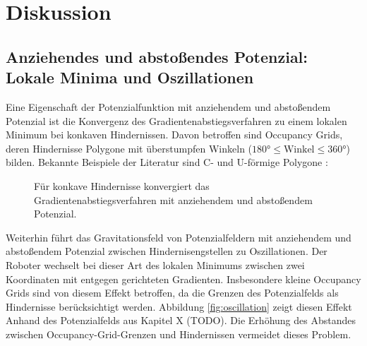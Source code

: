 \chapter{Diskussion}

\section{Anziehendes und abstoßendes Potenzial: Lokale Minima und Oszillationen}

Eine Eigenschaft der Potenzialfunktion mit anziehendem und abstoßendem Potenzial ist die Konvergenz des Gradientenabstiegsverfahren zu einem lokalen Minimum bei konkaven Hindernissen.
Davon betroffen sind Occupancy Grids, deren Hindernisse Polygone mit überstumpfen Winkeln ($180\text{°} \le \text{Winkel} \le 360\text{°}$) bilden.
Bekannte Beispiele der Literatur sind C- und U-förmige Polygone \cite{maqbool.2021, yujiang.2017}:
\begin{figure}[h!]
	\centering
	\footnotesize
	\centerline{}
	\caption{Für konkave Hindernisse konvergiert das Gradientenabstiegsverfahren mit anziehendem und abstoßendem Potenzial.}
\end{figure}

Weiterhin führt das Gravitationsfeld von Potenzialfeldern mit anziehendem und abstoßendem Potenzial zwischen Hindernisengstellen zu Oszillationen. Der Roboter wechselt bei dieser Art des lokalen Minimums zwischen zwei Koordinaten mit entgegen gerichteten Gradienten.
Insbesondere kleine Occupancy Grids sind von diesem Effekt betroffen, da die Grenzen des Potenzialfelds als Hindernisse berücksichtigt werden. Abbildung \ref{fig:oscillation} zeigt diesen Effekt Anhand des Potenzialfelds aus Kapitel X (TODO).
Die Erhöhung des Abstandes zwischen Occupancy-Grid-Grenzen und Hindernissen vermeidet dieses Problem.

